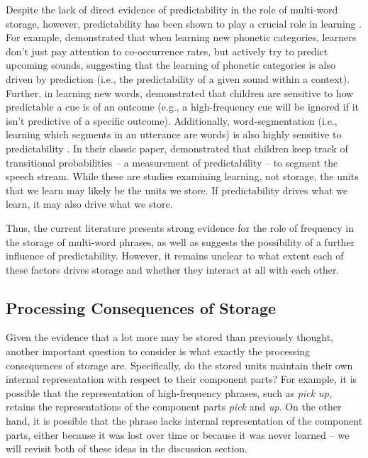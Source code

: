 \documentclass[
  authoryear,
  preprint,
  1p,
  onecolumn]{elsarticle}
\begin{document}
Despite the lack of direct evidence of predictability in the role of
multi-word storage, however, predictability has been shown to play a
crucial role in learning
\citep{olejarczuk2018, ramscar2013, saffran1996}. For example,
\citet{olejarczuk2018} demonstrated that when learning new phonetic
categories, learners don't just pay attention to co-occurrence rates,
but actively try to predict upcoming sounds, suggesting that the
learning of phonetic categories is also driven by prediction (i.e., the
predictability of a given sound within a context). Further, in learning
new words, \citet{ramscar2013} demonstrated that children are sensitive
to how predictable a cue is of an outcome (e.g., a high-frequency cue
will be ignored if it isn't predictive of a specific outcome).
Additionally, word-segmentation (i.e., learning which segments in an
utterance are words) is also highly sensitive to predictability
\citep{saffran1996}. In their classic paper, \citet{saffran1996}
demonstrated that children keep track of transitional probabilities -- a
measurement of predictability -- to segment the speech stream. While
these are studies examining learning, not storage, the units that we
learn may likely be the units we store. If predictability drives what we
learn, it may also drive what we store.

Thus, the current literature presents strong evidence for the role of
frequency in the storage of multi-word phrases, as well as suggests the
possibility of a further influence of predictability. However, it
remains unclear to what extent each of these factors drives storage and
whether they interact at all with each other.

\subsection{Processing Consequences of
Storage}\label{processing-consequences-of-storage}

Given the evidence that a lot more may be stored than previously
thought, another important question to consider is what exactly the
processing consequences of storage are. Specifically, do the stored
units maintain their own internal representation with respect to their
component parts? For example, it is possible that the representation of
high-frequency phrases, such as \emph{pick up,} retains the
representations of the component parts \emph{pick} and \emph{up}. On the
other hand, it is possible that the phrase lacks internal representation
of the component parts, either because it was lost over time or because
it was never learned -- we will revisit both of these ideas in the
discussion section.
\end{document}
